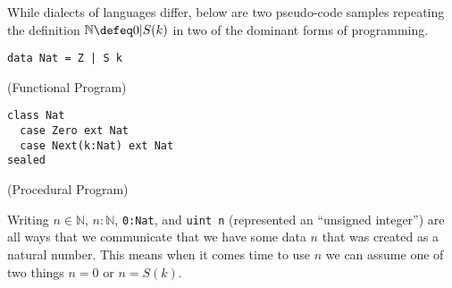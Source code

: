 While dialects of languages differ, below are two pseudo-code samples 
repeating the definition $\mathbb{N}\defeq 0|S(k)$
in two of the dominant forms of programming.
\begin{center}
\begin{minipage}{0.9\textwidth}
\begin{minipage}{3in}
\begin{lstlisting}[language=Hidris]
data Nat = Z | S k
\end{lstlisting}
\end{minipage}\hfill (Functional Program)\\
\begin{minipage}{3in}
\begin{lstlisting}[language=Sava]
class Nat 
  case Zero ext Nat
  case Next(k:Nat) ext Nat
sealed
\end{lstlisting}
\end{minipage}\hfill (Procedural Program)\\
\end{minipage}
\end{center}


Writing $n\in \mathbb{N}$, $n:\mathbb{N}$,
\lstinline{0:Nat}, and
\lstinline{uint n} (represented an ``unsigned integer'')
are all ways that we communicate that we have some data 
$n$ that was created as a natural number.
This means when it comes time to use $n$ we can assume
one of two things $n=0$ or $n=S(k)$.  

